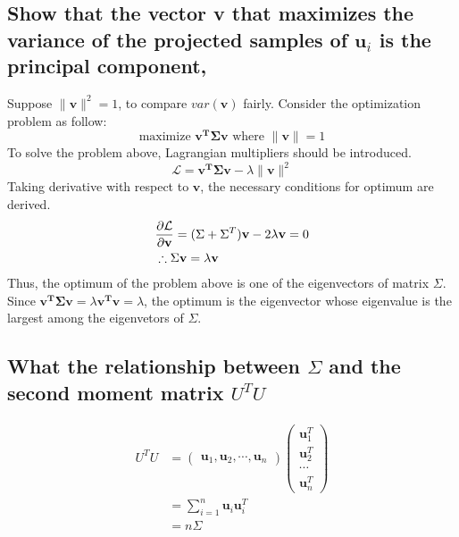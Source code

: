 \documentclass[10pt]{article}
\begin{document}
\subsection*{Show that the vector v that maximizes the variance of the projected samples of $\mathbf{u}_i$ is the principal component,}
Suppose $\lVert \mathbf{v} \rVert^2 = 1$, to compare $var(\mathbf{v})$ fairly.
Consider the optimization problem as follow:
\begin{equation}
    \text{maximize } \mathbf{v^T\Sigma v} \text{ where } \lVert \mathbf{v}\rVert=1
\end{equation}
To solve the problem above, Lagrangian multipliers should be introduced.
\begin{equation}
    \mathcal{L} = \mathbf{v^T\Sigma v} - \lambda \lVert \mathbf{v}\rVert^2
\end{equation}
Taking derivative with respect to $\mathbf{v}$, the necessary conditions for optimum are derived. 
\begin{align*}
    &{\partial \mathcal{L}\over \partial \mathbf{v}} = (\Sigma + \Sigma^T)\mathbf{v} - 2\lambda \mathbf{v} = 0\\
    &\therefore \Sigma \mathbf{v} = \lambda \mathbf{v}
\end{align*}
Thus, the optimum of the problem above is one of the eigenvectors of matrix $\Sigma$.
Since $\mathbf{v^T\Sigma v} = \lambda \mathbf{v^Tv} = \lambda$, the optimum is the eigenvector whose eigenvalue is the largest among the eigenvetors of $\Sigma$.

\subsection*{What the relationship between $\Sigma$ and the second moment matrix $U^TU$}

\begin{align*}
    U^TU &= \begin{pmatrix}
        \mathbf{u}_1, \mathbf{u}_2, \cdots, \mathbf{u}_n
    \end{pmatrix} \begin{pmatrix}
        \mathbf{u}^T_1\\ \mathbf{u}^T_2 \\ \cdots \\ \mathbf{u}^T_n
    \end{pmatrix}\\ 
    &= \sum_{i=1}^n \mathbf{u}_i\mathbf{u}_i^T \\
    &= n\Sigma
\end{align*}
\end{document}
